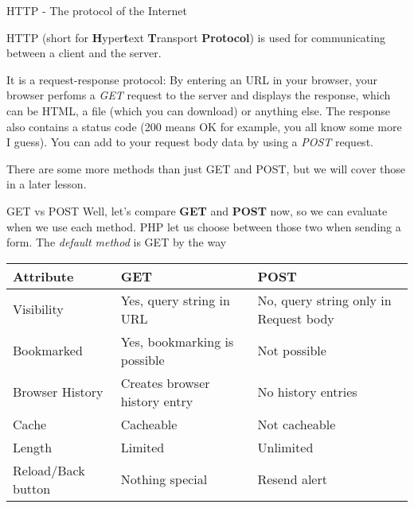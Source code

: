 \begin{frame}{HTTP - The protocol of the Internet}

	HTTP (short for \textbf{H}yper\textbf{t}ext \textbf{T}ransport \textbf{Protocol}) is used for communicating between a client and the server.\pause
	 
	It is a request-response protocol:
	By entering an URL in your browser, your browser perfoms a \emph{GET} request to the server and displays the response, which can be HTML, a file (which you can download) or anything else. The response also contains a status code (200 means OK for example, you all know some more I guess). \pause You can add to your request body data by using a \emph{POST} request. 
	
	There are some more methods than just GET and POST, but we will cover those in a later lesson.
\end{frame}

\begin{frame}{GET vs POST}
	Well, let's compare \textbf{GET} and \textbf{POST} now, so we can evaluate when we use each method. PHP let us choose between those two when sending a form. The \emph{default method} is GET by the way \pause
	\begin{center}
	
		\begin{tabular}{m{2.5cm} | m{3cm} | m{3cm}}
		Attribute & GET & POST \\
		\hline \pause
		Visibility & \pause Yes, query string in URL & No, query string only in Request body \\
		\hline \pause
		Bookmarked & \pause Yes, bookmarking is possible & Not possible \\
		\hline \pause
		Browser History & \pause Creates browser history entry & No history entries \\
		\hline \pause
		Cache & \pause Cacheable & Not cacheable \\
		\hline \pause
		Length & \pause Limited & Unlimited\\
		\hline \pause
		Reload/Back button & \pause Nothing special & Resend alert \\
		\end{tabular}
	
	\end{center}
	
\end{frame}

